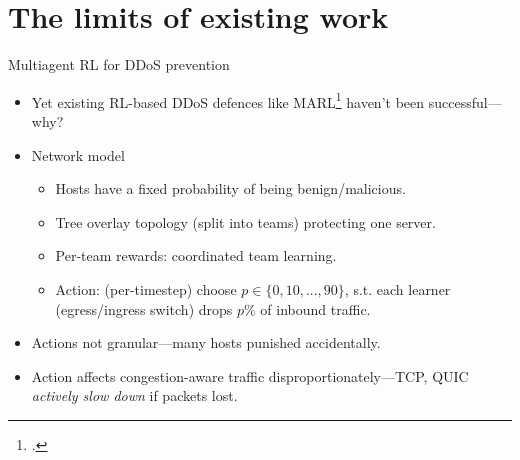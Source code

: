 \documentclass[aspectratio=169,xcolor={dvipsnames}
,hide notes
]{beamer}
\begin{document}


\section{The limits of existing work}

\begin{frame}{Multiagent RL for DDoS prevention}
%	
%	
%
	
	\begin{itemize}
		\item Yet existing RL-based DDoS defences like MARL\footcite{DBLP:journals/eaai/MalialisK15} haven't been successful---why?
		
		\item Network model
		\begin{itemize}
			\item Hosts have a fixed probability of being benign/malicious.
			\item Tree overlay topology (split into teams) protecting one server.
			\item Per-team rewards: \alert{coordinated team learning}.
			\item Action: (per-timestep) choose $p\in\{0,10,...,90\}$, s.t. each learner (egress/ingress switch) drops $p\%$ of inbound traffic.
		\end{itemize}
	
		\item \alert{Actions not granular}---many hosts punished accidentally.
		\item \alert{Action affects congestion-aware traffic disproportionately}---TCP, QUIC \emph{actively slow down} if packets lost.
	
	\end{itemize}
\end{frame}
\end{document}
